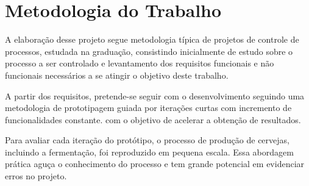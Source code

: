 \chapter{Metodologia do Trabalho}

A elaboração desse projeto segue metodologia típica de projetos de controle de
processos, estudada na graduação, consistindo inicialmente de estudo sobre o
processo a ser controlado e levantamento dos requisitos funcionais e não funcionais
necessários a se atingir o objetivo deste trabalho.


A partir dos requisitos, pretende-se seguir com o desenvolvimento seguindo uma
metodologia de prototipagem guiada por iterações curtas com incremento de
funcionalidades constante. com o objetivo de acelerar a obtenção de
resultados.


Para avaliar cada iteração do protótipo, o processo de produção de cervejas,
incluindo a fermentação, foi reproduzido em pequena escala. Essa abordagem prática 
aguça o conhecimento do processo e tem grande potencial em evidenciar erros no projeto.
